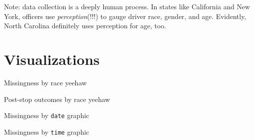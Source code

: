 \documentclass[11pt]{beamer}
\begin{document}
\begin{frame}{Note: data collection is a deeply human process.}
	In states like California and New York, officers use \emph{perception}(!!!) to gauge driver race, gender, and age. Evidently, North Carolina definitely uses perception for age, too. 
\end{frame}

\section{Visualizations}

\begin{frame}{Missingness by race}
yeehaw
\end{frame}

\begin{frame}{Post-stop outcomes by race}
yeehaw
\end{frame}

\begin{frame}{Missingness by \texttt{date}}
graphic
\end{frame}

\begin{frame}{Missingness by \texttt{time}}
graphic
\end{frame}

\iffalse

\section{First appendix section}

\begin{frame}{Appendix sample}

	Note that this slide doesn't count towards the total slides shown in the regular presentation

\end{frame}

\begin{frame}{hello}
    
\end{frame}
\fi
\end{document}
